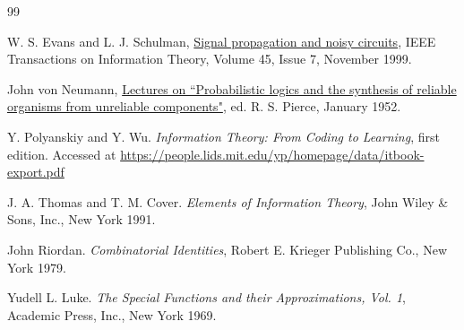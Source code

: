 \documentclass[12pt,reqno]{amsart}
\theoremstyle{plain} %
\theoremstyle{remark}
\theoremstyle{definition}
\begin{document}
\begin{thebibliography}{99}


W. S. Evans and L. J. Schulman,
\href{http://users.cms.caltech.edu/~schulman/Papers/evansS990611.pdf}{Signal propagation and noisy circuits},
IEEE Transactions on Information Theory, Volume 45, Issue 7, November 1999.

John von Neumann,
\href{https://web.mit.edu/6.454/www/papers/pierce_1952.pdf}{Lectures on ``Probabilistic logics and the synthesis of reliable organisms from unreliable components"},
ed. R. S. Pierce, January 1952.

Y. Polyanskiy and Y. Wu. \textit{Information Theory: From Coding to Learning}, first edition. Accessed at \href{https://people.lids.mit.edu/yp/homepage/data/itbook-export.pdf}{https://people.lids.mit.edu/yp/homepage/data/itbook-export.pdf}

J. A. Thomas and T. M. Cover. \textit{Elements of Information Theory}, John Wiley \& Sons, Inc., New York 1991.

John Riordan. \textit{Combinatorial Identities}, Robert E. Krieger Publishing Co., New York 1979.

Yudell L. Luke. \textit{The Special Functions and their Approximations, Vol. 1}, Academic Press, Inc., New York 1969.

\end{thebibliography}
\end{document}
